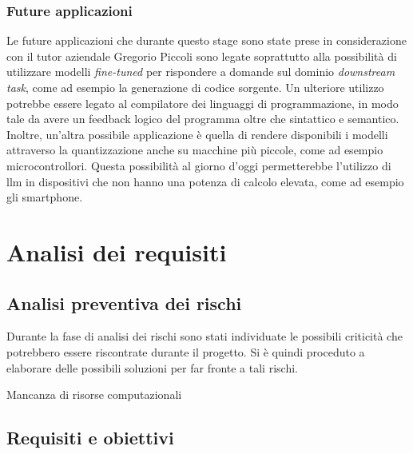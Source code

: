     \subsubsection{Future applicazioni} 
    Le future applicazioni che durante questo stage sono state prese in considerazione con il tutor aziendale Gregorio Piccoli sono legate soprattutto alla possibilità di utilizzare modelli 
    \textit{fine-tuned} per rispondere a domande sul dominio \textit{downstream task}, come ad esempio la generazione di codice sorgente.
    Un ulteriore utilizzo potrebbe essere legato al compilatore dei linguaggi di programmazione, in modo tale da avere un feedback logico del programma oltre che sintattico e semantico.
    Inoltre, un'altra possibile applicazione è quella di rendere disponibili i modelli attraverso la quantizzazione anche su macchine più piccole, come ad esempio microcontrollori. Questa possibilità al giorno d'oggi permetterebbe l'utilizzo 
    di \gls{llm} in dispositivi che non hanno una potenza di calcolo elevata, come ad esempio gli smartphone.

    
\section{Analisi dei requisiti}
    \subsection{Analisi preventiva dei rischi}
    Durante la fase di analisi dei rischi sono stati individuate le possibili criticità che potrebbero essere riscontrate durante il progetto.
    Si è quindi proceduto a elaborare delle possibili soluzioni per far fronte a tali rischi.
    \begin{risk}{Mancanza di risorse computazionali}
        \label{risk:data-absence} 
    \end{risk}

    \subsection{Requisiti e obiettivi}

